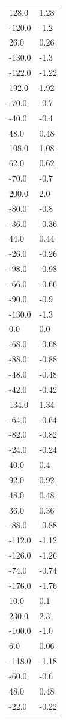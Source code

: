 \begin{longtable}{ll}
128.0 & 1.28 \\
-120.0 & -1.2 \\
26.0 & 0.26 \\
-130.0 & -1.3 \\
-122.0 & -1.22 \\
192.0 & 1.92 \\
-70.0 & -0.7 \\
-40.0 & -0.4 \\
48.0 & 0.48 \\
108.0 & 1.08 \\
62.0 & 0.62 \\
-70.0 & -0.7 \\
200.0 & 2.0 \\
-80.0 & -0.8 \\
-36.0 & -0.36 \\
44.0 & 0.44 \\
-26.0 & -0.26 \\
-98.0 & -0.98 \\
-66.0 & -0.66 \\
-90.0 & -0.9 \\
-130.0 & -1.3 \\
0.0 & 0.0 \\
-68.0 & -0.68 \\
-88.0 & -0.88 \\
-48.0 & -0.48 \\
-42.0 & -0.42 \\
134.0 & 1.34 \\
-64.0 & -0.64 \\
-82.0 & -0.82 \\
-24.0 & -0.24 \\
40.0 & 0.4 \\
92.0 & 0.92 \\
48.0 & 0.48 \\
36.0 & 0.36 \\
-88.0 & -0.88 \\
-112.0 & -1.12 \\
-126.0 & -1.26 \\
-74.0 & -0.74 \\
-176.0 & -1.76 \\
10.0 & 0.1 \\
230.0 & 2.3 \\
-100.0 & -1.0 \\
6.0 & 0.06 \\
-118.0 & -1.18 \\
-60.0 & -0.6 \\
48.0 & 0.48 \\
-22.0 & -0.22 \\

\end{longtable}
